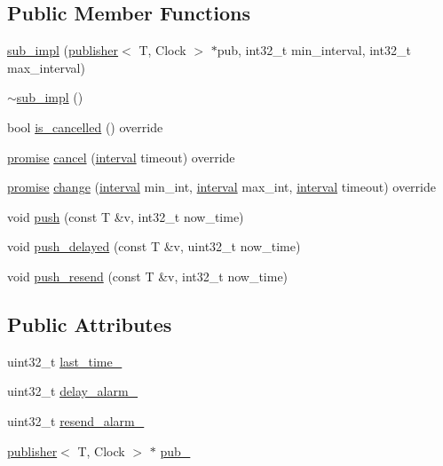 \subsection*{Public Member Functions}
\begin{DoxyCompactItemize}
\item 
\hyperlink{classtelegen_1_1publisher_1_1sub__impl_af79e7e1cbc3f4eb803b42438328a1bb1}{sub\+\_\+impl} (\hyperlink{classtelegen_1_1publisher}{publisher}$<$ T, Clock $>$ $\ast$pub, int32\+\_\+t min\+\_\+interval, int32\+\_\+t max\+\_\+interval)
\item 
\hyperlink{classtelegen_1_1publisher_1_1sub__impl_a91197bedcf945e62ca5ab0a5cd577081}{$\sim$sub\+\_\+impl} ()
\item 
bool \hyperlink{classtelegen_1_1publisher_1_1sub__impl_a9880e80ac0b1887b5aec423abbc0a6f3}{is\+\_\+cancelled} () override
\item 
\hyperlink{namespacetelegen_a9dd802bb5d30cf96b0c616750d43ae86}{promise} \hyperlink{classtelegen_1_1publisher_1_1sub__impl_ae0a84e8e0a45d21c688ee557c603c43d}{cancel} (\hyperlink{namespacetelegen_ad925de2d0a99bc43918533abf0457344}{interval} timeout) override
\item 
\hyperlink{namespacetelegen_a9dd802bb5d30cf96b0c616750d43ae86}{promise} \hyperlink{classtelegen_1_1publisher_1_1sub__impl_a2144a27beee3ef15a21fb7fd323b3770}{change} (\hyperlink{namespacetelegen_ad925de2d0a99bc43918533abf0457344}{interval} min\+\_\+int, \hyperlink{namespacetelegen_ad925de2d0a99bc43918533abf0457344}{interval} max\+\_\+int, \hyperlink{namespacetelegen_ad925de2d0a99bc43918533abf0457344}{interval} timeout) override
\item 
void \hyperlink{classtelegen_1_1publisher_1_1sub__impl_a9d4f5e7d31c57067abccddeca51adbb0}{push} (const T \&v, int32\+\_\+t now\+\_\+time)
\item 
void \hyperlink{classtelegen_1_1publisher_1_1sub__impl_a282c0e002c00b8649ca7b450fc35fd4f}{push\+\_\+delayed} (const T \&v, uint32\+\_\+t now\+\_\+time)
\item 
void \hyperlink{classtelegen_1_1publisher_1_1sub__impl_a3e36c9dec7f667891bb879ceae529879}{push\+\_\+resend} (const T \&v, int32\+\_\+t now\+\_\+time)
\end{DoxyCompactItemize}
\subsection*{Public Attributes}
\begin{DoxyCompactItemize}
\item 
uint32\+\_\+t \hyperlink{classtelegen_1_1publisher_1_1sub__impl_a479b96db21c40241b6eefca3e8c66f25}{last\+\_\+time\+\_\+}
\item 
uint32\+\_\+t \hyperlink{classtelegen_1_1publisher_1_1sub__impl_af732353e21826cd15007a6d7a5e315a5}{delay\+\_\+alarm\+\_\+}
\item 
uint32\+\_\+t \hyperlink{classtelegen_1_1publisher_1_1sub__impl_a087771e828beef87096487ac4e2e41ad}{resend\+\_\+alarm\+\_\+}
\item 
\hyperlink{classtelegen_1_1publisher}{publisher}$<$ T, Clock $>$ $\ast$ \hyperlink{classtelegen_1_1publisher_1_1sub__impl_a3433861f175df3cce9e1af5f03b0a076}{pub\+\_\+}
\end{DoxyCompactItemize}
